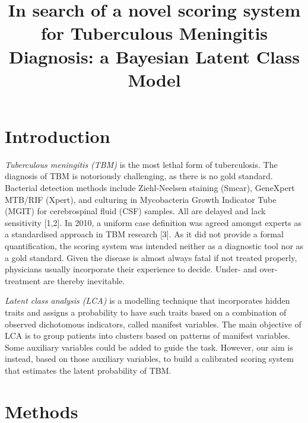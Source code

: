 \documentclass[
]{article}
\title{In search of a novel scoring system for Tuberculous Meningitis Diagnosis: a Bayesian Latent Class Model}
\author{}
\date{\vspace{-2.5em}}
\begin{document}
\maketitle

\doublespacing

\hypertarget{introduction}{%
\section{Introduction}\label{introduction}}

\emph{Tuberculous meningitis (TBM)} is the most lethal form of tuberculosis. The diagnosis of TBM is notoriously challenging, as there is no gold standard. Bacterial detection methods include Ziehl-Neelsen staining (Smear), GeneXpert MTB/RIF (Xpert), and culturing in Mycobacteria Growth Indicator Tube (MGIT) for cerebrospinal fluid (CSF) samples. All are delayed and lack sensitivity {[}1,2{]}. In 2010, a uniform case definition was agreed amongst experts as a standardised approach in TBM research {[}3{]}. As it did not provide a formal quantification, the scoring system was intended neither as a diagnostic tool nor as a gold standard. Given the disease is almost always fatal if not treated properly, physicians usually incorporate their experience to decide. Under- and over-treatment are thereby inevitable.

\emph{Latent class analysis (LCA)} is a modelling technique that incorporates hidden traits and assigns a probability to have such traits based on a combination of observed dichotomous indicators, called manifest variables. The main objective of LCA is to group patients into clusters based on patterns of manifest variables. Some auxiliary variables could be added to guide the task. However, our aim is instead, based on those auxiliary variables, to build a calibrated scoring system that estimates the latent probability of TBM.

\hypertarget{methods}{%
\section{Methods}\label{methods}}
\end{document}
